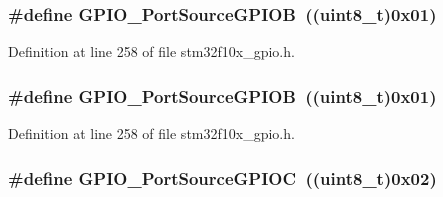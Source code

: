 \subsubsection[{\texorpdfstring{G\+P\+I\+O\+\_\+\+Port\+Source\+G\+P\+I\+OB}{GPIO_PortSourceGPIOB}}]{\setlength{\rightskip}{0pt plus 5cm}\#define G\+P\+I\+O\+\_\+\+Port\+Source\+G\+P\+I\+OB~(({\bf uint8\+\_\+t})0x01)}\hypertarget{group___g_p_i_o___port___sources_ga20a7ea6589564aee1fd5344bf01e65e5}{}\label{group___g_p_i_o___port___sources_ga20a7ea6589564aee1fd5344bf01e65e5}


Definition at line 258 of file stm32f10x\+\_\+gpio.\+h.

\subsubsection[{\texorpdfstring{G\+P\+I\+O\+\_\+\+Port\+Source\+G\+P\+I\+OB}{GPIO_PortSourceGPIOB}}]{\setlength{\rightskip}{0pt plus 5cm}\#define G\+P\+I\+O\+\_\+\+Port\+Source\+G\+P\+I\+OB~(({\bf uint8\+\_\+t})0x01)}\hypertarget{group___g_p_i_o___port___sources_ga20a7ea6589564aee1fd5344bf01e65e5}{}\label{group___g_p_i_o___port___sources_ga20a7ea6589564aee1fd5344bf01e65e5}


Definition at line 258 of file stm32f10x\+\_\+gpio.\+h.

\subsubsection[{\texorpdfstring{G\+P\+I\+O\+\_\+\+Port\+Source\+G\+P\+I\+OC}{GPIO_PortSourceGPIOC}}]{\setlength{\rightskip}{0pt plus 5cm}\#define G\+P\+I\+O\+\_\+\+Port\+Source\+G\+P\+I\+OC~(({\bf uint8\+\_\+t})0x02)}\hypertarget{group___g_p_i_o___port___sources_ga7511e96933d503ecf7128ebaff613e7e}{}\label{group___g_p_i_o___port___sources_ga7511e96933d503ecf7128ebaff613e7e}


